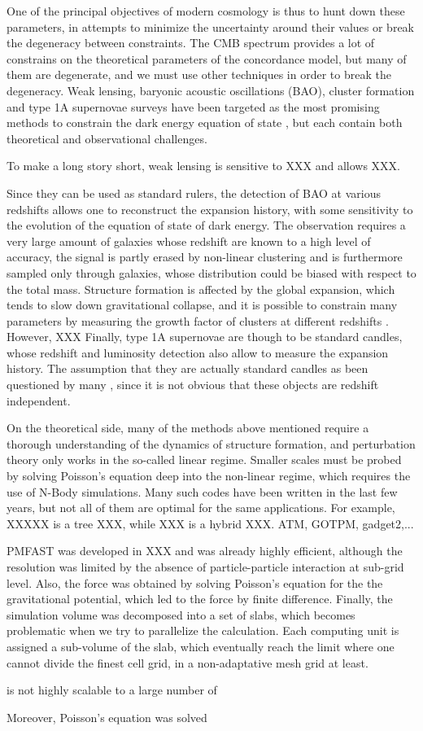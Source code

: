 One of the principal objectives of modern cosmology is thus to hunt down these parameters, in attempts to minimize the uncertainty around their values or break the degeneracy between constraints.
The CMB spectrum provides a lot of constrains on the theoretical parameters of the concordance model, but many of them are degenerate, and we must use other techniques in order to break the degeneracy. 
Weak lensing, baryonic acoustic oscillations (BAO), cluster formation and type 1A supernovae surveys
have been targeted as the most promising methods to constrain the dark energy equation of state \cite{ref:DETF}, but each contain
both theoretical and observational challenges.

To make a long story short, weak lensing is sensitive to XXX and allows XXX.

Since they can be used as standard rulers, the detection of BAO at various redshifts allows one to reconstruct the expansion history,
with some sensitivity to the evolution of the equation of state of dark energy. The observation requires a very large amount of galaxies whose
redshift are known to a high level of accuracy, the signal is partly erased by non-linear clustering and is furthermore sampled only through galaxies,
whose distribution could be biased with respect to the total mass. 
Structure formation is affected by the global expansion, which tends to slow down gravitational collapse, and it is possible to constrain
many parameters by measuring the growth factor of clusters at different redshifts \cite{ref:growth}. However, XXX
Finally, type 1A supernovae are though to be standard candles, whose redshift and luminosity detection also allow to measure the expansion history.
The assumption that they are actually standard candles as been questioned by many \cite{ref:SNdoubt}, since it is not obvious that these objects are redshift independent.


On the theoretical side, many of the methods above mentioned require a thorough understanding of the dynamics of structure formation, and
perturbation theory only works in the so-called linear regime. Smaller scales must be probed by solving Poisson's equation deep into the non-linear regime,
which requires the use of N-Body simulations. Many such codes have been written in the last few years, but not all of them are optimal for the same applications.
For example, XXXXX is a tree XXX, while XXX is a hybrid XXX. ATM, GOTPM, gadget2,...

PMFAST was developed in XXX \cite{ref:PMFAST} and was already highly efficient, although the resolution was limited by the absence of particle-particle interaction at sub-grid level. Also, the force was obtained by solving Poisson's equation for the the gravitational potential, which led to the force by finite difference. 
Finally, the simulation volume was decomposed into a set of slabs, which becomes problematic when we try to parallelize the calculation.
Each computing unit is assigned a sub-volume of the slab, which eventually reach the limit where one cannot divide the finest cell grid, in a non-adaptative mesh grid at least.

is not highly scalable to a large number of 


Moreover, Poisson's equation was solved 
